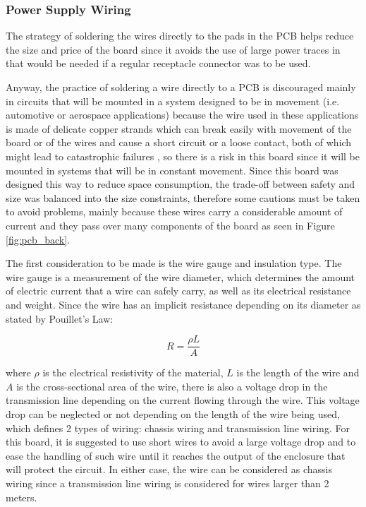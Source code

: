 \subsubsection{Power Supply Wiring}

The strategy of soldering the wires directly to the pads in the \ac{PCB} helps reduce the size and price of the board since it avoids the use of large power traces in that would be needed if a regular receptacle connector was to be used.

Anyway, the practice of soldering a wire directly to a \ac{PCB} is discouraged mainly in circuits that will be mounted in a system designed to be in movement (i.e. automotive or aerospace applications) because the wire used in these applications is made of delicate copper strands which can break easily with movement of the board or of the wires and cause a short circuit or a loose contact, both of which might lead to catastrophic failures , so there is a risk in this board since it will be mounted in systems that will be in constant movement. Since this board was designed this way to reduce space consumption, the trade-off between safety and size was balanced into the size constraints, therefore some cautions must be taken to avoid problems, mainly because these wires carry a considerable amount of current and they pass over many components of the board as seen in Figure \ref{fig:pcb_back}.


The first consideration to be made is the wire gauge and insulation type. The wire gauge is a measurement of the wire diameter, which determines the amount of electric current that a wire can safely carry, as well as its electrical resistance and weight. Since the wire has an implicit resistance depending on its diameter as stated by Pouillet's Law:


\begin{equation} \label{pouillet}
	R = \frac{\rho L}{A}
\end{equation}

where $\rho$ is the electrical resistivity of the material, $L$ is the length of the wire and $A$ is the cross-sectional area of the wire, there is also a voltage drop in the transmission line depending on the current flowing through the wire. This voltage drop can be neglected or not depending on the length of the wire being used, which defines 2 types of wiring: chassis wiring and transmission line wiring. For this board, it is suggested to use short wires to avoid a large voltage drop and to ease the handling of such wire until it reaches the output of the enclosure that will protect the circuit. In either case, the wire can be considered as chassis wiring since a transmission line wiring is considered for wires larger than 2 meters.

